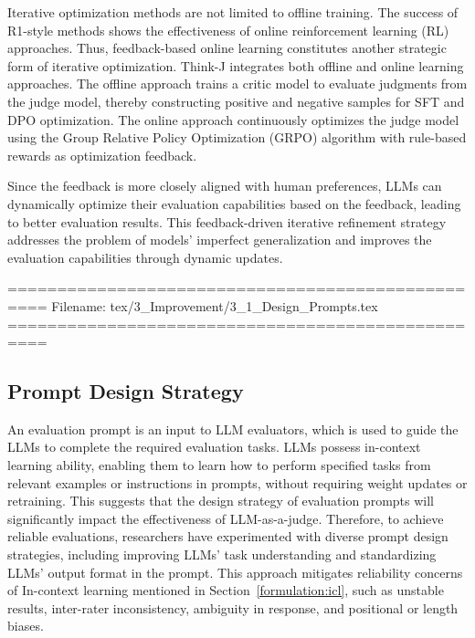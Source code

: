 Iterative optimization methods are not limited to offline training. The success of R1-style methods shows the effectiveness of online reinforcement learning (RL) approaches. Thus, feedback-based online learning constitutes another strategic form of iterative optimization. Think-J\cite{huang2025think} integrates both offline and online learning approaches. The offline approach trains a critic model to evaluate judgments from the judge model, thereby constructing positive and negative samples for SFT and DPO optimization. The online approach continuously optimizes the judge model using the Group Relative Policy Optimization (GRPO) algorithm with rule-based rewards as optimization feedback.

Since the feedback is more closely aligned with human preferences, LLMs can dynamically optimize their evaluation capabilities based on the feedback, leading to better evaluation results. This feedback-driven iterative refinement strategy addresses the problem of models' imperfect generalization and improves the evaluation capabilities through dynamic updates.


==================================================
Filename: tex/3_Improvement/3_1_Design_Prompts.tex
==================================================
\subsection{Prompt Design Strategy}\label{subsec:design_prompts}

An evaluation prompt is an input to LLM evaluators, which is used to guide the LLMs to complete the required evaluation tasks. LLMs possess in-context learning ability, enabling them to learn how to perform specified tasks from relevant examples or instructions in prompts,  without requiring weight updates or retraining\cite{brown2020language}. This suggests that the design strategy of evaluation prompts will significantly impact the effectiveness of LLM-as-a-judge. 
Therefore, to achieve reliable evaluations, researchers have experimented with diverse prompt design strategies, including improving LLMs' task understanding and standardizing LLMs' output format in the prompt. This approach mitigates reliability concerns of In-context learning mentioned in Section~\ref{formulation:icl}, such as unstable results, inter-rater inconsistency, ambiguity in response, and positional or length biases.


